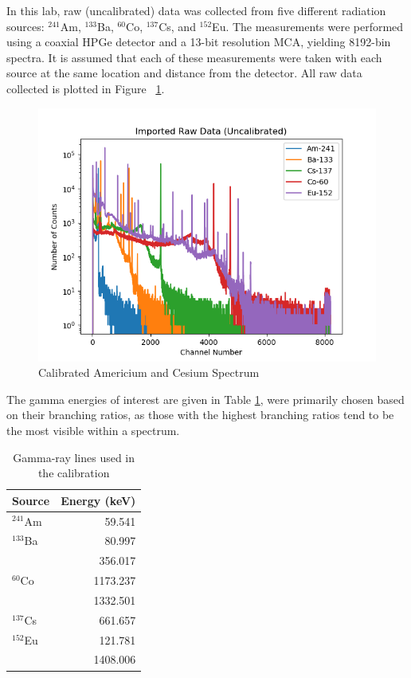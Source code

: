 In this lab, raw (uncalibrated) data was collected from five different
radiation sources:  $^{241}$Am, $^{133}$Ba, $^{60}$Co, $^{137}$Cs, and $^{152}$Eu.
The measurements were performed using a coaxial HPGe detector and a 13-bit resolution MCA,
yielding 8192-bin spectra. It is assumed that each of these measurements were
taken with each source at the same location and distance from the detector.
All raw data collected is plotted in Figure ~\ref{fig:raw}.



\begin{figure}[H]
\begin{center}
\includegraphics[width=.7\linewidth]{../images/rawdata.png}
\caption{Calibrated Americium and Cesium Spectrum \label{fig:raw}}
\end{center}

\end{figure}


The gamma energies of interest are given in Table
\ref{tab:src}, were primarily chosen based on their
branching ratios, as those with the highest branching ratios tend to be
the most visible within a spectrum.

\begin{table}[H]
  \begin{center}
    \begin{tabular}{l|r}
      \textbf{Source} & \textbf{Energy (keV)}\\
      \hline
      $^{241}$Am    &  59.541    \\
      $^{133}$Ba    &  80.997    \\
                    &  356.017   \\
      $^{60}$Co     &  1173.237  \\
                    &  1332.501  \\
      $^{137}$Cs    &  661.657   \\
      $^{152}$Eu    &  121.781   \\
                    &  1408.006  \\
    \end{tabular}
    \caption{Gamma-ray lines used in the calibration}
    \label{tab:src}
  \end{center}
\end{table}

